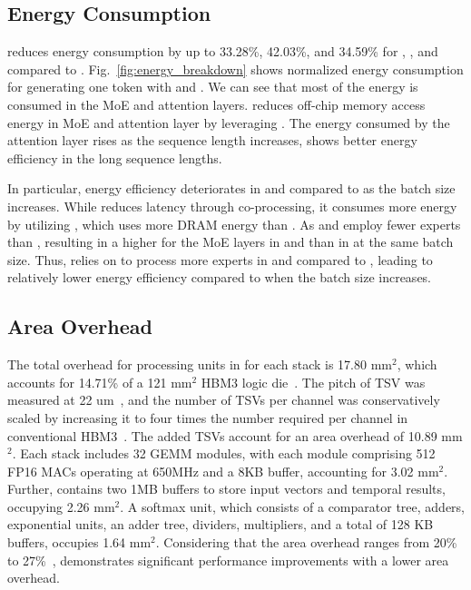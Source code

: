 \subsection{Energy Consumption}
\label{sec:eval:energy}
\duplex reduces energy consumption by up to 33.28\%, 42.03\%, and 34.59\% for \mixtral, \glam, and \grok compared to \gpu.
Fig.~\ref{fig:energy_breakdown} shows normalized energy consumption for generating one token with \duplex and \gpu.
We can see that most of the energy is consumed in the MoE and attention layers.
\duplex reduces off-chip memory access energy in MoE and attention layer by leveraging \lowp.
The energy consumed by the attention layer rises as the sequence length increases, \duplex shows better energy efficiency in the long sequence lengths. 

In particular, energy efficiency deteriorates in \mixtral and \grok compared to \glam as the batch size increases. 
While \duplex reduces latency through co-processing, it consumes more energy by utilizing \highp, which uses more DRAM energy than \lowp. 
As \mixtral and \grok employ fewer experts than \glam, resulting in a higher \opb for the MoE layers in \mixtral and \grok than in \glam at the same batch size.
Thus, \duplex relies on \highp to process more experts in \mixtral and \grok compared to \glam, leading to relatively lower energy efficiency compared to \gpu when the batch size increases.

\subsection{Area Overhead}
\label{sec:eval:area_overhead}
The total overhead for processing units in \duplex for each \lowp stack is 17.80 mm$^2$, which accounts for 14.71\% of a 121 mm$^2$ HBM3 logic die~\cite{jssc-2022-hynix-hbm3}. 
The pitch of TSV was measured at 22 um~\cite{SKhynix-tsv-pitch}, and the number of TSVs per channel was conservatively scaled by increasing it to four times the number required per channel in conventional HBM3~\cite{SKhynix-tsv-pitch}. 
The added TSVs account for an area overhead of 10.89 mm$^2$. 
Each \lowp stack includes 32 GEMM modules, with each module comprising 512 FP16 MACs operating at 650MHz and a 8KB buffer, accounting for 3.02 mm$^2$.
Further, \lowp contains two 1MB buffers to store input vectors and temporal results, occupying 2.26 mm$^2$.
A softmax unit, which consists of a comparator tree, adders, exponential units, an adder tree, dividers, multipliers, and a total of 128 KB buffers, occupies 1.64 mm$^2$.
Considering that the area overhead ranges from 20\% to 27\%~\cite{isca-2021-hbm-pim, isscc-2022-aim}, \duplex demonstrates significant performance improvements with a lower area overhead.



